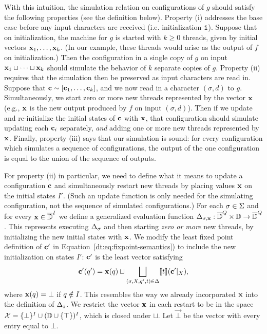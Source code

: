 With this intuition, the simulation relation on configurations of $g$ should satisfy the following properties (see the definition below). Property (i) addresses the base case before any input characters are received (i.e. initialization ${\texttt{i}}$). Suppose that on initialization, the machine for $g$ is started with $k \ge 0$ threads, given by initial vectors $\mathbf{x}_1, \ldots, \mathbf{x}_k$. (In our example, these threads would arise as the output of $f$ on initialization.) Then the configuration in a single copy of $g$ on input $\mathbf{x}_1 \sqcup \cdots \sqcup \mathbf{x}_k$ should simulate the behavior of $k$ separate copies of $g$. Property (ii) requires that the simulation then be preserved as input characters are read in. Suppose that $\mathbf{c} \sim [\mathbf{c}_1, \ldots, \mathbf{c}_k]$, and we now read in a character $(\sigma,d)$ to $g$. Simultaneously, we start zero or more new threads represented by the vector $\mathbf{x}$ (e.g., $\mathbf{x}$ is the new output produced by $f$ on input $(\sigma, d)$). Then if we update and re-initialize the initial states of $\mathbf{c}$ with $\mathbf{x}$, that configuration should simulate updating each $\mathbf{c}_i$ separately, \emph{and} adding one or more new threads represented by $\mathbf{x}$. Finally, property (iii) says that our simulation is sound: for every configuration which simulates a sequence of configurations, the output of the one configuration is equal to the union of the sequence of outputs.

For property (ii) in particular, we need to define what it means to update a configuration $\mathbf{c}$ and simultaneously restart new threads by placing values $\mathbf{x}$ on the initial states $I'$. (Such an update function is only needed for the simulating configuration, not the sequence of simulated configurations.) For each $\sigma \in \Sigma$ and for every $\mathbf{x} \in \overline{\mathbb{D}{}}^I$ we define a generalized evaluation function $\Delta_{\sigma,\mathbf{x}}: \overline{\mathbb{D}{}}^Q \times \mathbb{D} \to \overline{\mathbb{D}{}}^Q$. This represents executing $\Delta_\sigma$ and then starting \emph{zero or more} new threads, by initializing the new initial states with $\mathbf{x}$. We modify the least fixed point definition of $\mathbf{c}'$ in Equation~\ref{dt:eq:fixpoint-semantics}) to include the new initialization on states $I'$: $\mathbf{c}'$ is the least vector satisfying
\[
\mathbf{c}'(q') = \mathbf{x}(q) \sqcup \bigsqcup_{(\sigma, X, q', t) \in \Delta} \llbracket t \rrbracket(\mathbf{c}'|_X),
\]
where $\mathbf{x}(q) = \bot$ if $q \notin I$. This resembles the way we already incorporated $\mathbf{x}$ into the definition of $\Delta_{\texttt{i}}$.
We restrict the vector $\mathbf{x}$ in each restart to be in the space $\mathcal{X} = \{\bot\}^I \cup (\mathbb{D} \cup \{\top\})^I$, which is closed under $\sqcup$.
Let $\vec{\bot}$ be the vector with every entry equal to $\bot$.

